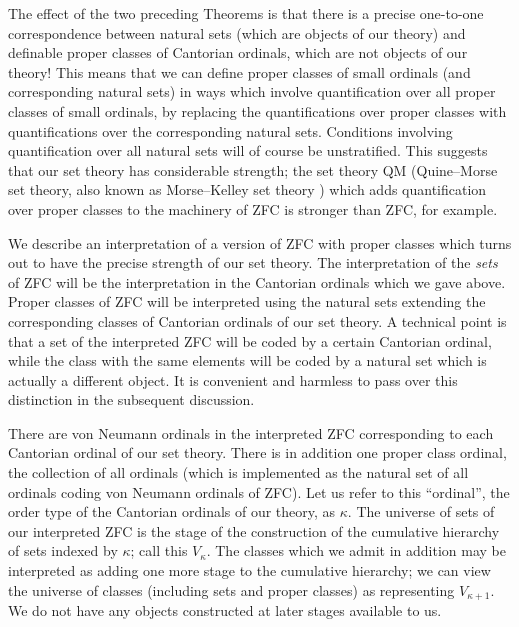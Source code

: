 The effect of the two preceding Theorems is that there is a precise
one-to-one correspondence between natural sets (which are objects of
our theory) and definable proper classes of Cantorian
ordinals, which 
are not objects of our theory!  This means that we can
define proper classes of small ordinals (and corresponding natural
sets) in ways which involve quantification over all proper classes of
small ordinals, by replacing the quantifications over proper classes
with quantifications over the corresponding natural sets.  Conditions
involving quantification over all natural sets will of course be
unstratified.  This suggests that our set theory has
considerable 
strength; the set theory QM (Quine--Morse set theory, also
known as Morse--Kelley set theory ) which adds
quantification over 
proper classes to the machinery of ZFC is
stronger than ZFC, for example.

We describe an interpretation of a version of ZFC with proper
classes which turns out to have the precise strength of our set
theory.  The interpretation of the {\itshape sets\/} of ZFC will be
the interpretation in the Cantorian
ordinals which we gave above.
Proper classes of ZFC will be interpreted
using the natural 
sets extending the corresponding classes of Cantorian ordinals of our
set theory.  A technical point is that a set of the interpreted
ZFC will be coded by a certain Cantorian ordinal, while the class
with the same elements will be coded by a natural set which is
actually a different object.  It is convenient and harmless to pass
over this distinction in the subsequent discussion.

There are von Neumann ordinals in the interpreted
ZFC
corresponding to each Cantorian ordinal of our set
theory.  There is 
in addition one proper class ordinal, the collection of all ordinals
(which is implemented as the natural set of all ordinals coding von
Neumann ordinals of ZFC).  Let us refer to this ``ordinal'',
the order type of the Cantorian ordinals of our theory, as
$\kappa$. 
The universe of sets of our interpreted
ZFC is the stage of
the construction of the cumulative hierarchy of sets indexed by
$\kappa$; call this $V_{\kappa}$.  The classes which we admit in
addition may be interpreted as adding one more stage to the cumulative
hierarchy; we can view the universe of classes (including sets and
proper classes) as representing $V_{\kappa+1}$.  We do not have any
objects constructed at later stages available to us.

